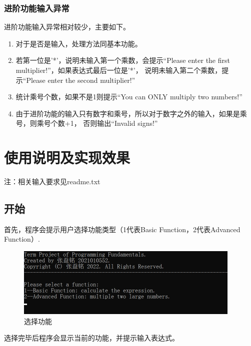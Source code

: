 \documentclass[a4paper, 11pt, UTF8]{ctexart}
\begin{document}
\subsubsection{进阶功能输入异常}

进阶功能输入异常相对较少，主要如下。

\begin{enumerate}
    \item 对于是否是输入，处理方法同基本功能。
    \item 若第一位是'*'，说明未输入第一个乘数，会提示“Please enter the first multiplier!”，如果表达式最后一位是'*'，
          说明未输入第二个乘数，提示“Please enter the second multiplier!”
    \item 统计乘号个数，如果不是1则提示“You can ONLY multiply two numbers!”
    \item 由于进阶功能的输入只有数字和乘号，所以对于数字之外的输入，如果是乘号，则乘号个数+1，
          否则输出“Invalid signs!”
\end{enumerate}

\section{使用说明及实现效果}

注：相关输入要求见readme.txt

\subsection{开始}

首先，程序会提示用户选择功能类型（1代表Basic Function，2代表Advanced Function）.

\begin{figure}[H]
    \centering
    \includegraphics[width=0.96\textwidth]{begin.png}
    \caption{选择功能}
\end{figure}

选择完毕后程序会显示当前的功能，并提示输入表达式。
\end{document}
